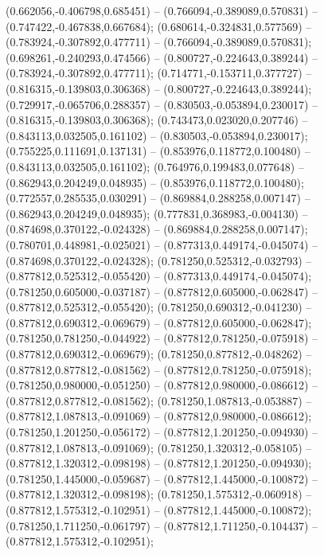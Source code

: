  (0.662056,-0.406798,0.685451) -- (0.766094,-0.389089,0.570831) -- (0.747422,-0.467838,0.667684);
 (0.680614,-0.324831,0.577569) -- (0.783924,-0.307892,0.477711) -- (0.766094,-0.389089,0.570831);
 (0.698261,-0.240293,0.474566) -- (0.800727,-0.224643,0.389244) -- (0.783924,-0.307892,0.477711);
 (0.714771,-0.153711,0.377727) -- (0.816315,-0.139803,0.306368) -- (0.800727,-0.224643,0.389244);
 (0.729917,-0.065706,0.288357) -- (0.830503,-0.053894,0.230017) -- (0.816315,-0.139803,0.306368);
 (0.743473,0.023020,0.207746) -- (0.843113,0.032505,0.161102) -- (0.830503,-0.053894,0.230017);
 (0.755225,0.111691,0.137131) -- (0.853976,0.118772,0.100480) -- (0.843113,0.032505,0.161102);
 (0.764976,0.199483,0.077648) -- (0.862943,0.204249,0.048935) -- (0.853976,0.118772,0.100480);
 (0.772557,0.285535,0.030291) -- (0.869884,0.288258,0.007147) -- (0.862943,0.204249,0.048935);
 (0.777831,0.368983,-0.004130) -- (0.874698,0.370122,-0.024328) -- (0.869884,0.288258,0.007147);
 (0.780701,0.448981,-0.025021) -- (0.877313,0.449174,-0.045074) -- (0.874698,0.370122,-0.024328);
 (0.781250,0.525312,-0.032793) -- (0.877812,0.525312,-0.055420) -- (0.877313,0.449174,-0.045074);
 (0.781250,0.605000,-0.037187) -- (0.877812,0.605000,-0.062847) -- (0.877812,0.525312,-0.055420);
 (0.781250,0.690312,-0.041230) -- (0.877812,0.690312,-0.069679) -- (0.877812,0.605000,-0.062847);
 (0.781250,0.781250,-0.044922) -- (0.877812,0.781250,-0.075918) -- (0.877812,0.690312,-0.069679);
 (0.781250,0.877812,-0.048262) -- (0.877812,0.877812,-0.081562) -- (0.877812,0.781250,-0.075918);
 (0.781250,0.980000,-0.051250) -- (0.877812,0.980000,-0.086612) -- (0.877812,0.877812,-0.081562);
 (0.781250,1.087813,-0.053887) -- (0.877812,1.087813,-0.091069) -- (0.877812,0.980000,-0.086612);
 (0.781250,1.201250,-0.056172) -- (0.877812,1.201250,-0.094930) -- (0.877812,1.087813,-0.091069);
 (0.781250,1.320312,-0.058105) -- (0.877812,1.320312,-0.098198) -- (0.877812,1.201250,-0.094930);
 (0.781250,1.445000,-0.059687) -- (0.877812,1.445000,-0.100872) -- (0.877812,1.320312,-0.098198);
 (0.781250,1.575312,-0.060918) -- (0.877812,1.575312,-0.102951) -- (0.877812,1.445000,-0.100872);
 (0.781250,1.711250,-0.061797) -- (0.877812,1.711250,-0.104437) -- (0.877812,1.575312,-0.102951);
